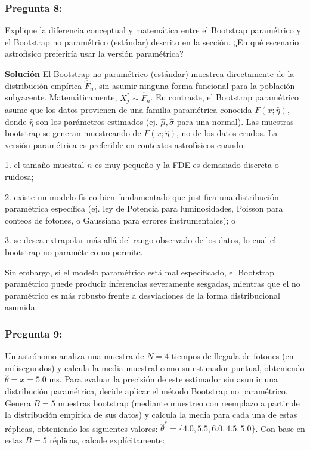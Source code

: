 \documentclass[a4paper]{article}
\begin{document}
\subsubsection{Pregunta 8:} Explique la diferencia conceptual y matemática entre el Bootstrap paramétrico y el Bootstrap no paramétrico (estándar) descrito en la sección. ¿En qué escenario astrofísico preferiría usar la versión paramétrica?

\textbf{Solución}
El Bootstrap no paramétrico (estándar) muestrea directamente de la distribución empírica $\hat{F}_n$, sin asumir ninguna forma funcional para la población subyacente. Matemáticamente, $X_j^* \sim \hat{F}_n$. En contraste, el Bootstrap paramétrico asume que los datos provienen de una familia paramétrica conocida $F(x; \hat{\eta})$, donde $\hat{\eta}$ son los parámetros estimados (ej. $\hat{\mu}, \hat{\sigma}$ para una normal). Las muestras bootstrap se generan muestreando de $F(x; \hat{\eta})$, no de los datos crudos. La versión paramétrica es preferible en contextos astrofísicos cuando: 

1. el tamaño muestral $n$ es muy pequeño y la FDE es demasiado discreta o ruidosa;

2. existe un modelo físico bien fundamentado que justifica una distribución paramétrica específica (ej. ley de Potencia para luminosidades, Poisson para conteos de fotones, o Gaussiana para errores instrumentales); o 

3. se desea extrapolar más allá del rango observado de los datos, lo cual el bootstrap no paramétrico no permite. 

Sin embargo, si el modelo paramétrico está mal especificado, el Bootstrap paramétrico puede producir inferencias severamente sesgadas, mientras que el no paramétrico es más robusto frente a desviaciones de la forma distribucional asumida.


\subsubsection{Pregunta 9:} Un astrónomo analiza una muestra de $N=4$ tiempos de llegada de fotones (en milisegundos) y calcula la media muestral como su estimador puntual, obteniendo $\hat{\theta} = \bar{x} = 5.0$ ms. Para evaluar la precisión de este estimador sin asumir una distribución paramétrica, decide aplicar el método Bootstrap no paramétrico. Genera $B=5$ muestras bootstrap (mediante muestreo con reemplazo a partir de la distribución empírica de sus datos) y calcula la media para cada una de estas réplicas, obteniendo los siguientes valores: $\hat{\theta}^* = \{4.0, 5.5, 6.0, 4.5, 5.0\}$. 
Con base en estas $B=5$ réplicas, calcule explícitamente: 
\end{document}
